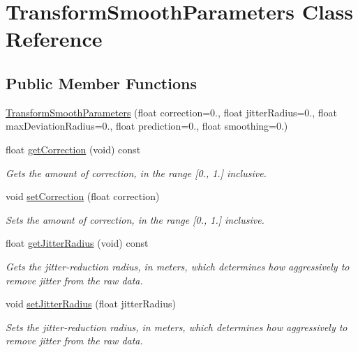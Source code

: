 \hypertarget{class_transform_smooth_parameters}{\section{\-Transform\-Smooth\-Parameters \-Class \-Reference}
\label{class_transform_smooth_parameters}
}
\subsection*{\-Public \-Member \-Functions}
\begin{DoxyCompactItemize}
\item 
\hyperlink{class_transform_smooth_parameters_a5a192c6aa0046d4fbea5e21de349b207}{\-Transform\-Smooth\-Parameters} (float correction=0., float jitter\-Radius=0., float max\-Deviation\-Radius=0., float prediction=0., float smoothing=0.)
\item 
float \hyperlink{class_transform_smooth_parameters_a36e1de6cd8721a865cec97a99ed517a8}{get\-Correction} (void) const 
\begin{DoxyCompactList}\small\item\em \-Gets the amount of correction, in the range \mbox{[}0., 1.\mbox{]} inclusive. \end{DoxyCompactList}\item 
void \hyperlink{class_transform_smooth_parameters_a07ffe8a2ce2480325bd32fccd70b39d5}{set\-Correction} (float correction)
\begin{DoxyCompactList}\small\item\em \-Sets the amount of correction, in the range \mbox{[}0., 1.\mbox{]} inclusive. \end{DoxyCompactList}\item 
float \hyperlink{class_transform_smooth_parameters_afa9cdd6cd3458866e100c43c4b6b52c9}{get\-Jitter\-Radius} (void) const 
\begin{DoxyCompactList}\small\item\em \-Gets the jitter-\/reduction radius, in meters, which determines how aggressively to remove jitter from the raw data. \end{DoxyCompactList}\item 
void \hyperlink{class_transform_smooth_parameters_ae4b56a20bbf3aacd9115896fd51769f3}{set\-Jitter\-Radius} (float jitter\-Radius)
\begin{DoxyCompactList}\small\item\em \-Sets the jitter-\/reduction radius, in meters, which determines how aggressively to remove jitter from the raw data. \end{DoxyCompactList}\item 

\end{DoxyCompactItemize}
